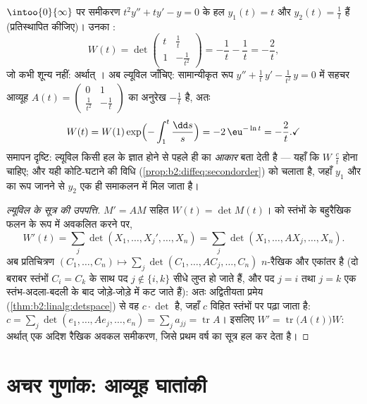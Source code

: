 \begin{example}\label{ex:b2:diffeq:eulerwronskian}
$\intoo{0}{\infty}$ पर समीकरण $t^2y'' + ty' - y = 0$ के हल $y_1(t) = t$ और $y_2(t) = \frac1t$ हैं (प्रतिस्थापित कीजिए)। उनका
:
\[
W(t) = \det\begin{pmatrix} t & \tfrac1t\\[2pt]
1 & -\tfrac{1}{t^2}\end{pmatrix}
= -\frac1t - \frac1t = -\frac2t ,
\]
जो कभी शून्य नहीं: अर्थात् । अब ल्यूविल जाँचिए: सामान्यीकृत
रूप $y'' + \frac1t\,y' - \frac{1}{t^2}\,y = 0$ में सहचर आव्यूह $A(t) = \begin{pmatrix} 0 & 1\\ \frac{1}{t^2}
& -\frac1t\end{pmatrix}$ का अनुरेख $-\frac1t$ है, अतः
\[
W(t) = W(1)\exp\Bigl(-\int_1^t\frac{\dd s}{s}\Bigr)
= -2\,\eu^{-\ln t} = -\frac2t . \checkmark
\]
समापन दृष्टि: ल्यूविल किसी हल के ज्ञात होने से पहले ही  का
\emph{आकार} बता देती है --- यहाँ कि $W$ $\frac{c}{t}$ होना चाहिए; और यही
कोटि-घटाने की विधि (\cref{prop:b2:diffeq:secondorder}) को चलाता है, जहाँ $y_1$ और  का रूप
जानने से $y_2$ एक ही समाकलन में मिल जाता है।
\end{example}

\begin{proof}[ल्यूविल के सूत्र की उपपत्ति]
$M' = AM$ सहित $W(t) = \det M(t)$।  को स्तंभों के बहुरैखिक फलन के रूप में अवकलित करने
पर,
\[
W'(t) = \sum_j \det(X_1, \dots, X_j', \dots, X_n)
= \sum_j \det(X_1, \dots, AX_j, \dots, X_n) .
\]
अब प्रतिचित्रण $(C_1, \dots, C_n) \mapsto \sum_j \det(C_1, \dots,
AC_j, \dots, C_n)$ $n$-रैखिक और एकांतर है (दो बराबर स्तंभों $C_i = C_k$ के साथ पद
$j \notin \{i, k\}$ सीधे लुप्त हो जाते हैं, और पद $j = i$ तथा $j = k$ एक स्तंभ-अदला-बदली के बाद
जोड़े-जोड़े में कट जाते हैं): अतः अद्वितीयता प्रमेय (\cref{thm:b2:linalg:detspace}) से वह $c \cdot \det$ है,
जहाँ $c$ विहित स्तंभों पर पढ़ा जाता है: $c = \sum_j \det(e_1, \dots, Ae_j, \dots,
e_n) = \sum_j a_{jj} = \operatorname{tr} A$। इसलिए $W' =
\operatorname{tr}\bigl(A(t)\bigr)W$: अर्थात् एक
अदिश रैखिक अवकल समीकरण, जिसे प्रथम वर्ष का सूत्र हल कर देता है।
\end{proof}

\section{अचर गुणांक: आव्यूह घातांकी}

